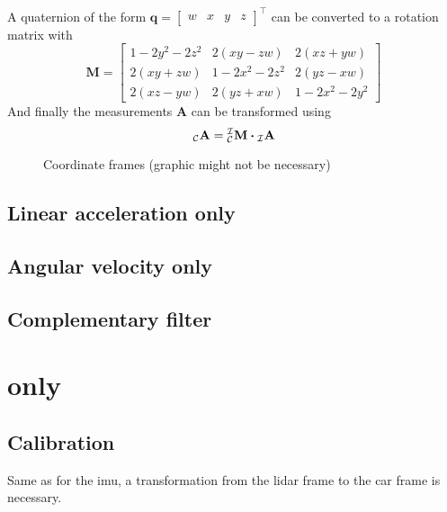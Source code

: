 A quaternion of the form
$\mathbf{q} = \left[\begin{array}{llll} w & x & y & z \end{array}\right]^{\top}$
can be converted to a rotation matrix with
\begin{equation}
    \mathbf{M} =
    \left[
        \begin{array}{ccc}
            1-2 y^{2}-2 z^{2} & 2(x y-z w) & 2(x z+y w) \\
            2(x y+z w) & 1-2 x^{2}-2 z^{2} & 2(y z-x w) \\
            2(x z-y w) & 2(y z+x w) & 1-2 x^{2}-2 y^{2}
        \end{array}
        \right]
    \end{equation}
And finally the measurements $\mathbf{A}$ can be transformed using
\begin{equation}
    \vincs{A}{c} = \mtf{i}{c} \vdot \vincs{A}{i}
\end{equation}

\begin{figure}[htpb]
    \centering
    
	\caption{Coordinate frames (graphic might not be necessary)}
    \label{fig:tikz_car_frames}
\end{figure}

\subsection{Linear acceleration only}


\subsection{Angular velocity only}


\subsection{Complementary filter}



\section{ only}
\subsection{Calibration}
Same as for the \acrshort{imu}, a transformation from the \acrshort{lidar} frame to the car frame is necessary.

